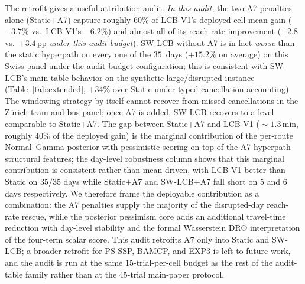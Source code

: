 \documentclass[11pt]{article}
\theoremstyle{definition}
\theoremstyle{remark}
\begin{document}
The retrofit gives a useful attribution audit. \emph{In this
audit}, the two A7 penalties alone (Static$+$A7) capture roughly
$60\%$ of LCB-V1's deployed cell-mean gain ($-3.7\%$ vs.\
LCB-V1's $-6.2\%$) and almost all of its reach-rate improvement
($+2.8$ vs.\ $+3.4$\,pp \emph{under this audit budget}). SW-LCB without A7 is in fact \emph{worse} than the
static hyperpath on every one of the $35$~days ($+15.2\%$ on
average) on this Swiss panel under the audit-budget
configuration; this is consistent with SW-LCB's main-table
behavior on the synthetic large/disrupted instance
(Table~\ref{tab:extended}, $+34\%$ over Static under
typed-cancellation accounting). The windowing strategy by itself
cannot recover from missed cancellations in the Z\"urich
tram-and-bus panel; once A7 is added, SW-LCB recovers to a level
comparable to Static$+$A7. The gap between Static$+$A7 and LCB-V1
($\!\sim\!1.3$\,min, roughly $40\%$ of the deployed gain) is the
marginal contribution of the per-route Normal--Gamma posterior
with pessimistic scoring on top of the A7 hyperpath-structural
features; the day-level robustness column shows that this
marginal contribution is consistent rather than mean-driven, with
LCB-V1 better than Static on $35/35$ days while Static$+$A7 and
SW-LCB$+$A7 fall short on $5$ and $6$ days respectively. We
therefore frame the deployable contribution as a combination:
the A7 penalties supply the majority of the disrupted-day
reach-rate rescue, while the posterior pessimism core adds an
additional travel-time reduction with day-level stability and
the formal Wasserstein DRO interpretation of the four-term
scalar score. This audit retrofits A7 only into Static and
SW-LCB; a broader retrofit for PS-SSP, BAMCP, and EXP3 is left
to future work, and the audit is run at the same
$15$-trial-per-cell budget as the rest of the audit-table family
rather than at the $45$-trial main-paper protocol.
\end{document}
